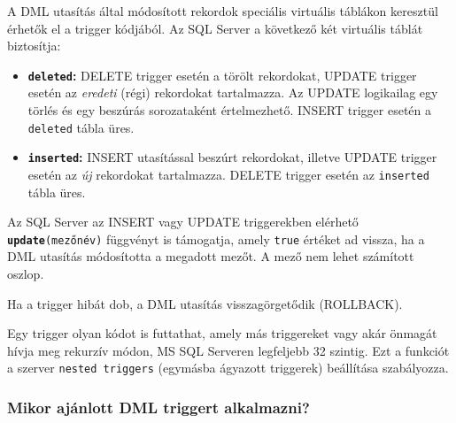 \documentclass[
  magyar,
]{article}
\providecommand{\tightlist}{%
  \setlength{\itemsep}{0pt}\setlength{\parskip}{0pt}}
\begin{document}
A DML utasítás által módosított rekordok speciális virtuális táblákon
keresztül érhetők el a trigger kódjából. Az SQL Server a következő két
virtuális táblát biztosítja:

\begin{itemize}
\tightlist
\item
  \textbf{\texttt{deleted}:} DELETE trigger esetén a törölt rekordokat,
  UPDATE trigger esetén az \emph{eredeti} (régi) rekordokat tartalmazza.
  Az UPDATE logikailag egy törlés és egy beszúrás sorozataként
  értelmezhető. INSERT trigger esetén a \texttt{deleted} tábla üres.
\item
  \textbf{\texttt{inserted}:} INSERT utasítással beszúrt rekordokat,
  illetve UPDATE trigger esetén az \emph{új} rekordokat tartalmazza.
  DELETE trigger esetén az \texttt{inserted} tábla üres.
\end{itemize}

Az SQL Server az INSERT vagy UPDATE triggerekben elérhető
\textbf{\texttt{update}}\texttt{(mezőnév)} függvényt is támogatja, amely
\texttt{true} értéket ad vissza, ha a DML utasítás módosította a
megadott mezőt. A mező nem lehet számított oszlop.

Ha a trigger hibát dob, a DML utasítás visszagörgetődik (ROLLBACK).

Egy trigger olyan kódot is futtathat, amely más triggereket vagy akár
önmagát hívja meg rekurzív módon, MS SQL Serveren legfeljebb 32 szintig.
Ezt a funkciót a szerver \texttt{nested\ triggers} (egymásba ágyazott
triggerek) beállítása szabályozza.

\subsubsection{Mikor ajánlott DML triggert
alkalmazni?}\label{mikor-ajuxe1nlott-dml-triggert-alkalmazni}
\end{document}
